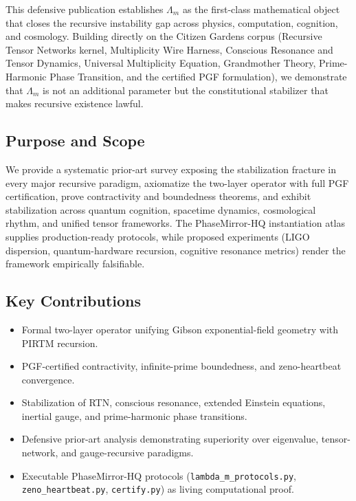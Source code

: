 \documentclass[11pt, a4paper]{article}
\begin{document}
This defensive publication establishes \(\Lambda_m\) as the first-class mathematical object that closes the recursive instability gap across physics, computation, cognition, and cosmology. Building directly on the Citizen Gardens corpus (Recursive Tensor Networks kernel, Multiplicity Wire Harness, Conscious Resonance and Tensor Dynamics, Universal Multiplicity Equation, Grandmother Theory, Prime-Harmonic Phase Transition, and the certified PGF formulation), we demonstrate that \(\Lambda_m\) is not an additional parameter but the constitutional stabilizer that makes recursive existence lawful.

\subsection{Purpose and Scope}
We provide a systematic prior-art survey exposing the stabilization fracture in every major recursive paradigm, axiomatize the two-layer operator with full PGF certification, prove contractivity and boundedness theorems, and exhibit stabilization across quantum cognition, spacetime dynamics, cosmological rhythm, and unified tensor frameworks. The PhaseMirror-HQ instantiation atlas supplies production-ready protocols, while proposed experiments (LIGO dispersion, quantum-hardware recursion, cognitive resonance metrics) render the framework empirically falsifiable.

\subsection{Key Contributions}
\begin{itemize}
    \item Formal two-layer operator unifying Gibson exponential-field geometry with PIRTM recursion.
    \item PGF-certified contractivity, infinite-prime boundedness, and zeno-heartbeat convergence.
    \item Stabilization of RTN, conscious resonance, extended Einstein equations, inertial gauge, and prime-harmonic phase transitions.
    \item Defensive prior-art analysis demonstrating superiority over eigenvalue, tensor-network, and gauge-recursive paradigms.
    \item Executable PhaseMirror-HQ protocols (\texttt{lambda\_m\_protocols.py}, \texttt{zeno\_heartbeat.py}, \texttt{certify.py}) as living computational proof.
\end{itemize}
\end{document}

